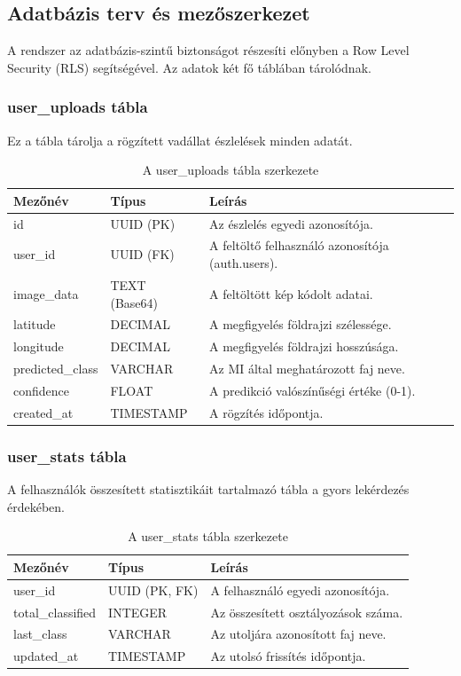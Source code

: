\documentclass[
	parspace, %
]{elteikthesis}[2024/04/26]
\begin{document}
\subsection{Adatbázis terv és mezőszerkezet}
A rendszer az adatbázis-szintű biztonságot részesíti előnyben a Row Level Security (RLS) segítségével. Az adatok két fő táblában tárolódnak.

\subsubsection{user\_uploads tábla}
Ez a tábla tárolja a rögzített vadállat észlelések minden adatát.
\begin{table}[H]
\centering
\begin{tabular}{|l|l|l|}
\hline
\textbf{Mezőnév} & \textbf{Típus} & \textbf{Leírás} \\ \hline
id & UUID (PK) & Az észlelés egyedi azonosítója. \\ \hline
user\_id & UUID (FK) & A feltöltő felhasználó azonosítója (auth.users). \\ \hline
image\_data & TEXT (Base64) & A feltöltött kép kódolt adatai. \\ \hline
latitude & DECIMAL & A megfigyelés földrajzi szélessége. \\ \hline
longitude & DECIMAL & A megfigyelés földrajzi hosszúsága. \\ \hline
predicted\_class & VARCHAR & Az MI által meghatározott faj neve. \\ \hline
confidence & FLOAT & A predikció valószínűségi értéke (0-1). \\ \hline
created\_at & TIMESTAMP & A rögzítés időpontja. \\ \hline
\end{tabular}
\caption{A user\_uploads tábla szerkezete}
\end{table}

\subsubsection{user\_stats tábla}
A felhasználók összesített statisztikáit tartalmazó tábla a gyors lekérdezés érdekében.
\begin{table}[H]
\centering
\begin{tabular}{|l|l|l|}
\hline
\textbf{Mezőnév} & \textbf{Típus} & \textbf{Leírás} \\ \hline
user\_id & UUID (PK, FK) & A felhasználó egyedi azonosítója. \\ \hline
total\_classified & INTEGER & Az összesített osztályozások száma. \\ \hline
last\_class & VARCHAR & Az utoljára azonosított faj neve. \\ \hline
updated\_at & TIMESTAMP & Az utolsó frissítés időpontja. \\ \hline
\end{tabular}
\caption{A user\_stats tábla szerkezete}
\end{table}
\end{document}
